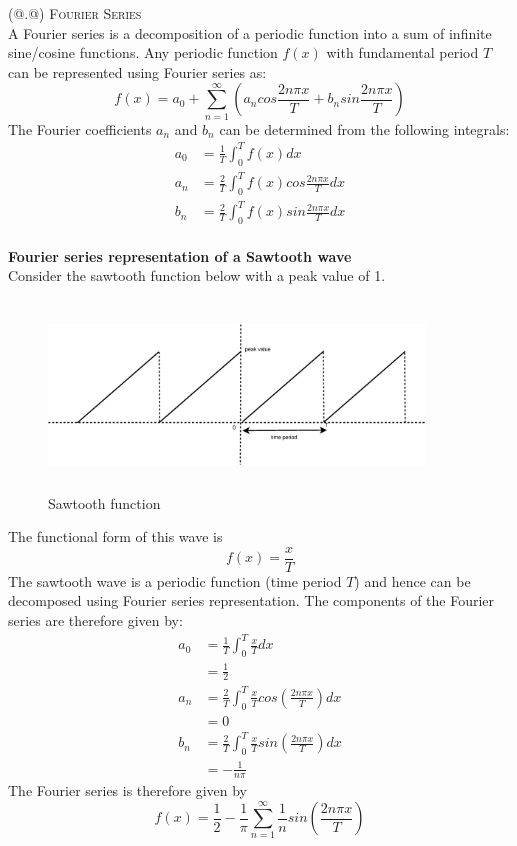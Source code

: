 \documentclass[a4paper,12pt]{article}
\makeatletter
\newcommand*{\rom}[1]{\expandafter\@slowromancap\romannumeral #1@}
\makeatother
\begin{document}
\noindent (\rom{2}.\rom{2}) \textsc{Fourier Series} \\
\hspace*{5mm} A Fourier series is a decomposition of a periodic function into a sum of infinite sine/cosine functions. Any periodic function $f(x)$ with fundamental period $T$ can be represented using Fourier series as:
\[ f(x) = a_0 + \sum_{n=1}^{\infty} \left( a_n cos \frac{2 n\pi x}{T} + b_n sin \frac{2 n \pi x}{T} \right) \]
The Fourier coefficients $a_n$ and $b_n$ can be determined from the following integrals:
\begin{align*}
 a_0 &= \frac{1}{T} \int_{0}^{T} f(x) dx \\
 a_n &= \frac{2}{T} \int_{0}^{T} f(x) cos \frac{2 n\pi x}{T} dx \\ 
 b_n &= \frac{2}{T} \int_{0}^{T} f(x) sin \frac{2 n\pi x}{T} dx 
\end{align*}\\

\noindent\textbf{Fourier series representation of a Sawtooth wave} \\
Consider the sawtooth function below with a peak value of 1. 
\begin{figure}[htpb]
  \begin{center}
    \includegraphics*[width=10cm,height=5cm]{./images/sawtooth.eps}
    \caption {Sawtooth function}
    \label{fig:sawtooth}
  \end{center}
\end{figure}
The functional form of this wave is \[ f(x) = \frac{x}{T} \] The sawtooth wave is a periodic function (time period $T$) and hence can be decomposed using Fourier series representation. The components of the Fourier series are therefore given by:
{
\allowdisplaybreaks
\begin{align*}
 a_0 &= \frac{1}{T} \int_{0}^{T} \frac{x}{T} dx \\
     &= \frac{1}{2} \\
 a_n &= \frac{2}{T} \int_{0}^{T} \frac{x}{T} cos \left( \frac{2n\pi x}{T} \right) dx \\
     &= 0 \\
 b_n &= \frac{2}{T} \int_{0}^{T} \frac{x}{T} sin \left( \frac{2n\pi x}{T} \right) dx \\
     &= -\frac{1}{n\pi}      
\end{align*}
}
The Fourier series is therefore given by
\begin{equation} \label{eqn:infinite_fourier_sawtooth}
 f(x) = \frac{1}{2} - \frac{1}{\pi} \sum_{n=1}^{\infty}\frac{1}{n}sin\left(\frac{2n\pi x}{T}\right)
\end{equation}
\end{document}
